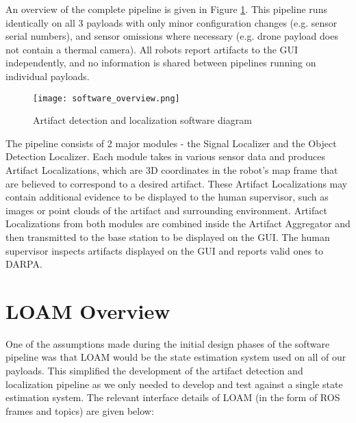 An overview of the complete pipeline is given in Figure \ref{software_overview}. This pipeline runs identically on all 3 payloads with only minor configuration changes (e.g. sensor serial numbers), and sensor omissions where necessary (e.g. drone payload does not contain a thermal camera). All robots report artifacts to the GUI independently, and no information is shared between pipelines running on individual payloads.

\begin{figure}	
	\centering
	\texttt{[image: software\_overview.png]}
	\caption{Artifact detection and localization software diagram}
	\label{software_overview}
\end{figure}

The pipeline consists of 2 major modules - the Signal Localizer and the Object Detection Localizer. Each module takes in various sensor data and produces Artifact Localizations, which are 3D coordinates in the robot's map frame that are believed to correspond to a desired artifact. These Artifact Localizations may contain additional evidence to be displayed to the human supervisor, such as images or point clouds of the artifact and surrounding environment. Artifact Localizations from both modules are combined inside the Artifact Aggregator and then transmitted to the base station to be displayed on the GUI. The human supervisor inspects artifacts displayed on the GUI and reports valid ones to DARPA.

\section{LOAM Overview}

One of the assumptions made during the initial design phases of the software pipeline was that LOAM would be the state estimation system used on all of our payloads. This simplified the development of the artifact detection and localization pipeline as we only needed to develop and test against a single state estimation system. The relevant interface details of LOAM (in the form of ROS frames and topics) are given below:

